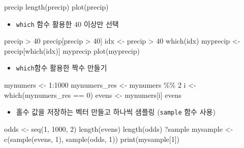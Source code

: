 \documentclass[
]{book}
\newenvironment{Shaded}{\begin{snugshade}}{\end{snugshade}}
\newcommand{\DecValTok}[1]{\textcolor[rgb]{0.00,0.00,0.81}{#1}}
\newcommand{\FunctionTok}[1]{\textcolor[rgb]{0.00,0.00,0.00}{#1}}
\newcommand{\NormalTok}[1]{#1}
\newcommand{\OtherTok}[1]{\textcolor[rgb]{0.56,0.35,0.01}{#1}}
\newcommand{\SpecialCharTok}[1]{\textcolor[rgb]{0.00,0.00,0.00}{#1}}
\providecommand{\tightlist}{%
  \setlength{\itemsep}{0pt}\setlength{\parskip}{0pt}}
\begin{document}
\begin{Shaded}
\begin{Highlighting}[]
\NormalTok{precip}
\FunctionTok{length}\NormalTok{(precip)}
\FunctionTok{plot}\NormalTok{(precip)}
\end{Highlighting}
\end{Shaded}

\begin{itemize}
\tightlist
\item
  \texttt{which} 함수 활용한 40 이상만 선택
\end{itemize}

\begin{Shaded}
\begin{Highlighting}[]
\NormalTok{precip }\SpecialCharTok{\textgreater{}} \DecValTok{40}
\NormalTok{precip[precip }\SpecialCharTok{\textgreater{}} \DecValTok{40}\NormalTok{]}
\NormalTok{idx }\OtherTok{\textless{}{-}}\NormalTok{ precip }\SpecialCharTok{\textgreater{}} \DecValTok{40}
\FunctionTok{which}\NormalTok{(idx)}
\NormalTok{myprecip }\OtherTok{\textless{}{-}}\NormalTok{ precip[}\FunctionTok{which}\NormalTok{(idx)]}
\NormalTok{myprecip}
\FunctionTok{plot}\NormalTok{(myprecip)}
\end{Highlighting}
\end{Shaded}

\begin{itemize}
\tightlist
\item
  \texttt{which}함수 활용한 짝수 만들기
\end{itemize}

\begin{Shaded}
\begin{Highlighting}[]
\NormalTok{mynumers }\OtherTok{\textless{}{-}} \DecValTok{1}\SpecialCharTok{:}\DecValTok{1000}
\NormalTok{mynumers\_res }\OtherTok{\textless{}{-}}\NormalTok{ mynumers }\SpecialCharTok{\%\%} \DecValTok{2}
\NormalTok{i }\OtherTok{\textless{}{-}} \FunctionTok{which}\NormalTok{(mynumers\_res }\SpecialCharTok{==} \DecValTok{0}\NormalTok{)}
\NormalTok{evens }\OtherTok{\textless{}{-}}\NormalTok{ mynumers[i]}
\NormalTok{evens}
\end{Highlighting}
\end{Shaded}

\begin{itemize}
\tightlist
\item
  홀수 값을 저장하는 벡터 만들고 하나씩 샘플링 (\texttt{sample} 함수 사용)
\end{itemize}

\begin{Shaded}
\begin{Highlighting}[]
\NormalTok{odds }\OtherTok{\textless{}{-}} \FunctionTok{seq}\NormalTok{(}\DecValTok{1}\NormalTok{, }\DecValTok{1000}\NormalTok{, }\DecValTok{2}\NormalTok{)}
\FunctionTok{length}\NormalTok{(evens)}
\FunctionTok{length}\NormalTok{(odds)}
\NormalTok{?sample}
\NormalTok{mysample }\OtherTok{\textless{}{-}} \FunctionTok{c}\NormalTok{(}\FunctionTok{sample}\NormalTok{(evens, }\DecValTok{1}\NormalTok{), }\FunctionTok{sample}\NormalTok{(odds, }\DecValTok{1}\NormalTok{))}
\FunctionTok{print}\NormalTok{(mysample[}\DecValTok{1}\NormalTok{])}
\end{Highlighting}
\end{Shaded}
\end{document}
